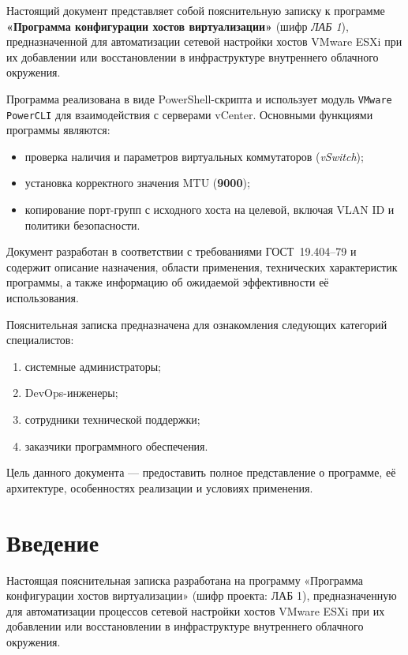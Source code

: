\newpage\annotation

Настоящий документ представляет собой пояснительную записку к программе \textbf{«Программа конфигурации хостов виртуализации»} (шифр \textit{ЛАБ 1}), предназначенной для автоматизации сетевой настройки хостов VMware ESXi при их добавлении или восстановлении в инфраструктуре внутреннего облачного окружения.

Программа реализована в виде PowerShell-скрипта и использует модуль \texttt{VMware PowerCLI} для взаимодействия с серверами vCenter. Основными функциями программы являются:
\begin{itemize}
\item проверка наличия и параметров виртуальных коммутаторов (\textit{vSwitch});
\item установка корректного значения MTU (\textbf{9000});
\item копирование порт-групп с исходного хоста на целевой, включая VLAN ID и политики безопасности.
\end{itemize}

Документ разработан в соответствии с требованиями ГОСТ~19.404--79 и содержит описание назначения, области применения, технических характеристик программы, а также информацию об ожидаемой эффективности её использования.

Пояснительная записка предназначена для ознакомления следующих категорий специалистов:
\begin{enumerate}
    \item системные администраторы;
    \item DevOps-инженеры;
    \item сотрудники технической поддержки;
    \item заказчики программного обеспечения.
\end{enumerate}

Цель данного документа --- предоставить полное представление о программе, её архитектуре, особенностях реализации и условиях применения.

\newpage
\section{Введение}

Настоящая пояснительная записка разработана на программу «Программа конфигурации хостов виртуализации» (шифр проекта: ЛАБ 1), предназначенную для автоматизации процессов сетевой настройки хостов VMware ESXi при их добавлении или восстановлении в инфраструктуре внутреннего облачного окружения.

